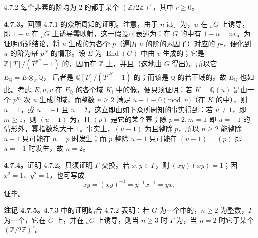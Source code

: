 \begin{SGAresult}{}{4.7.2}
每个非素的阶均为 $2$ 的都于某个 $(\mathbb Z/2\mathbb Z)^r$，其中 $r\geq0$。
\end{SGAresult}
\textbf{4.7.3。}回顾 4.7.1 的众所周知的证明。注意，由于 $n\operatorname{id}_G$ 为，$u$ 在 ${}_nG$ 上诱导，即 $1-u$ 在 ${}_nG$ 上诱导零映射，这一假设可表述为：在 $G$ 的中有 $1-u=nv$。为证明所述结论，将 $u$ 生成的为各个 $p$（遍历 $u$ 的阶的素因子）对应的 $p$-，便化到 $u$ 的阶为幂 $p^N$ 的情形。设 $E$ 为 $\operatorname{End}(G)$ 中由 $v$ 生成的；它是 $\mathbb Z[T]/(T^{p^N}-1)$ 的，因而在 $\mathbb Z$ 上，并且（这地由 $G$ 得出）。所以它 $E_{\mathbb Q}=E\otimes_{\mathbb Z}\mathbb Q$，
后者是 $\mathbb Q[T]/(T^{p^N}-1)$ 的；而该是 $\mathbb Q$ 的若干域的。故 $E_{\mathbb Q}$ 也如此。考虑 $E,u,v$ 在 $E_{\mathbb Q}$ 的各个域 $K_i$ 中的像，便只须证明：若 $K=\mathbb Q(u)$ 是由一个 $p^m$ 次 $u$ 生成的域，而整数 $n\geq2$ 满足 $u-1\equiv0\pmod n$（在 $K$ 的中），则 $u=1$，或 $u=-1$ 且 $n=2$。这立即由如下众所周知的事实得到：若 $u\ne1$，即 $m\geq1$，则 $(u-1)$ 为，且 $(p)$ 是它的某个幂；除 $p=2,m=1$ 即 $u=-1$ 的情形外，幂指数均大于 $1$。事实上，$(u-1)$ 为且整除 $p$，所以 $n\geq2$ 能整除 $u-1$ 只可能在 $n=p$ 时发生；而 $p$ 整除 $u-1$ 只可能在 $(u-1)=(p)$ 即 $u=-1$ 时发生，故 $n=2$。

\textbf{4.7.4。}证明 4.7.2。只须证明 $\Gamma$ 交换。若 $x,y\in\Gamma$，则 $(xy)(xy)=1$；因 $x^2=1$、$y^2=1$，也可写成
\[
 xy=(xy)^{-1}=y^{-1}x^{-1}=yx,
\]
证毕。

\textbf{注记 4.7.5。}4.7.3 中的证明结合 4.7.2 表明：若 $G$ 为一个中的，$n\geq2$ 为整数，$\Gamma$ 为一个，它在 $G$ 上，并在 ${}_nG$ 上诱导，则当 $n\geq3$ 时 $\Gamma$ 为，当 $n=2$ 时它于某个 $(\mathbb Z/2\mathbb Z)^r$。
